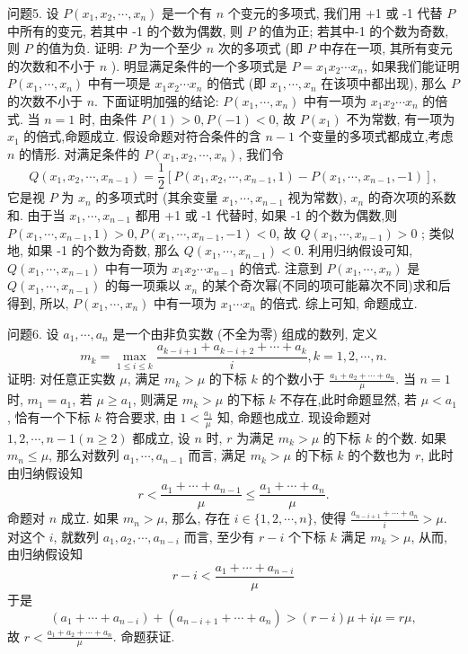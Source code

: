 问题5. 设 $P\left(x_1, x_2, \cdots, x_n\right)$ 是一个有 $n$ 个变元的多项式, 我们用 +1 或 -1 代替 $P$ 中所有的变元, 若其中 -1 的个数为偶数, 则 $P$ 的值为正; 若其中-1 的个数为奇数, 则 $P$ 的值为负.
证明: $P$ 为一个至少 $n$ 次的多项式 (即 $P$ 中存在一项, 其所有变元的次数和不小于 $n$ ).
明显满足条件的一个多项式是 $P=x_1 x_2 \cdots x_n$, 如果我们能证明 $P\left(x_1, \cdots, x_n\right)$ 中有一项是 $x_1 x_2 \cdots x_n$ 的倍式 (即 $x_1, \cdots, x_n$ 在该项中都出现), 那么 $P$ 的次数不小于 $n$.
下面证明加强的结论: $P\left(x_1, \cdots, x_n\right)$ 中有一项为 $x_1 x_2 \cdots x_n$ 的倍式.
当 $n=1$ 时, 由条件 $P(1)>0, P(-1)<0$, 故 $P\left(x_1\right)$ 不为常数, 有一项为 $x_1$ 的倍式,命题成立.
假设命题对符合条件的含 $n-1$ 个变量的多项式都成立,考虑 $n$ 的情形.
对满足条件的 $P\left(x_1, x_2, \cdots, x_n\right)$, 我们令
$$
Q\left(x_1, x_2, \cdots, x_{n-1}\right)=\frac{1}{2}\left[P\left(x_1, x_2, \cdots, x_{n-1}, 1\right)-P\left(x_1, \cdots, x_{n-1},-1\right)\right],
$$
它是视 $P$ 为 $x_n$ 的多项式时 (其余变量 $x_1, \cdots, x_{n-1}$ 视为常数), $x_n$ 的奇次项的系数和.
由于当 $x_1, \cdots, x_{n-1}$ 都用 +1 或 -1 代替时, 如果 -1 的个数为偶数,则 $P\left(x_1, \cdots, x_{n-1}, 1\right)>0, P\left(x_1, \cdots, x_{n-1},-1\right)<0$, 故 $Q\left(x_1, \cdots, x_{n-1}\right)>0$ ; 类似地, 如果 -1 的个数为奇数, 那么 $Q\left(x_1, \cdots, x_{n-1}\right)<0$. 利用归纳假设可知, $Q\left(x_1, \cdots, x_{n-1}\right)$ 中有一项为 $x_1 x_2 \cdots x_{n-1}$ 的倍式.
注意到 $P\left(x_1, \cdots, x_n\right)$ 是 $Q\left(x_1, \cdots, x_{n-1}\right)$ 的每一项乘以 $x_n$ 的某个奇次幂(不同的项可能幕次不同)求和后得到, 所以, $P\left(x_1, \cdots, x_n\right)$ 中有一项为 $x_1 \cdots x_n$ 的倍式.
综上可知, 命题成立.



问题6. 设 $a_1, \cdots, a_n$ 是一个由非负实数 (不全为零) 组成的数列, 定义
$$
m_k=\max _{1 \leqslant i \leqslant k} \frac{a_{k-i+1}+a_{k-i+2}+\cdots+a_k}{i}, k=1,2, \cdots, n .
$$
证明: 对任意正实数 $\mu$, 满足 $m_k>\mu$ 的下标 $k$ 的个数小于 $\frac{a_1+a_2+\cdots+a_n}{\mu}$.
当 $n=1$ 时, $m_1=a_1$, 若 $\mu \geqslant a_1$, 则满足 $m_k>\mu$ 的下标 $k$ 不存在,此时命题显然, 若 $\mu<a_1$, 恰有一个下标 $k$ 符合要求, 由 $1<\frac{a_1}{\mu}$ 知, 命题也成立.
现设命题对 $1,2, \cdots, n-1(n \geqslant 2)$ 都成立, 设 $n$ 时, $r$ 为满足 $m_k>\mu$ 的下标 $k$ 的个数.
如果 $m_n \leqslant \mu$, 那么对数列 $a_1, \cdots, a_{n-1}$ 而言, 满足 $m_k>\mu$ 的下标 $k$ 的个数也为 $r$, 此时由归纳假设知
$$
r<\frac{a_1+\cdots+a_{n-1}}{\mu} \leqslant \frac{a_1+\cdots+a_n}{\mu} .
$$
命题对 $n$ 成立.
如果 $m_n>\mu$, 那么, 存在 $i \in\{1,2, \cdots, n\}$, 使得 $\frac{a_{n-i+1}+\cdots+a_n}{i}>\mu$. 对这个 $i$, 就数列 $a_1, a_2, \cdots, a_{n-i}$ 而言, 至少有 $r-i$ 个下标 $k$ 满足 $m_k>\mu$, 从而, 由归纳假设知
$$
r-i<\frac{a_1+\cdots+a_{n-i}}{\mu}
$$
于是
$$
\left(a_1+\cdots+a_{n-i}\right)+\left(a_{n-i+1}+\cdots+a_n\right)>(r-i) \mu+i \mu=r \mu,
$$
故 $r<\frac{a_1+a_2+\cdots+a_n}{\mu}$.
命题获证.



